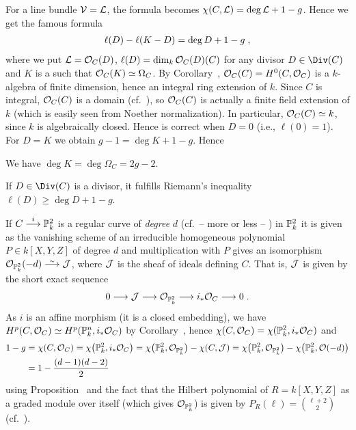 \documentclass[a4paper,parskip=half,numbers=enddot, DIV=12]{scrreprt}
\begin{document}
\begin{rem}
	For a line bundle $\mathcal{V}=\mathcal{L}$, the formula becomes $\chi(C,\mathcal{L})=\deg\mathcal{L}+1-g$. Hence we get the famous formula
	\begin{align}\lbl{eq:RiemannRoch3}
		\ell(D)-\ell(K-D)=\deg D+1-g\;,
	\end{align}
	where we put $\mathcal{L}=\mathcal{O}_C(D)$, $\ell(D)=\dim_k\mathcal{O}_C(D)(C)$ for any divisor $D\in\Div(C)$ and $K$ is a  such that $\mathcal{O}_C(K)\simeq\Omega_C$. By Corollary~, $\mathcal{O}_C(C)=H^0(C,\mathcal{O}_C)$ is a $k$-algebra of finite dimension, hence an integral ring extension of $k$. Since $C$ is integral, $\mathcal{O}_C(C)$ is a domain (cf.\ \cite[Proposition~2.1.4]{alggeo1}), so $\mathcal{O}_C(C)$ is actually a finite field extension of $k$ (which is easily seen from Noether normalization). In particular, $\mathcal{O}_C(C)\simeq k$, since $k$ is algebraically closed. Hence  is correct when $D=0$ (i.e., $\ell(0)=1$). For $D=K$ we obtain $g-1=\deg K+1-g$. Hence
\end{rem}
\begin{fact}
	We have $\deg K=\deg\Omega_C=2g-2$.
\end{fact}
\begin{cor}
	If $D\in\Div(C)$ is a divisor, it fulfills Riemann's inequality $\ell(D)\geq \deg D+1-g$.
\end{cor}
\begin{example}
	If $C\morphism[i]\IP^2_k$ is a regular curve of \emph{degree} $d$ (cf.\ -- more or less -- \cite[Definition~3.1.5]{alg2}) in $\mathbb{P}_k^2$ it is given as the vanishing scheme of an irreducible homogeneous polynomial $P\in k[X,Y,Z]$ of degree $d$ and multiplication with $P$ gives an isomorphism $\Oo_{\IP_k^2}(-d)\isomorphism\Jj$, where $\mathcal{J}$ is the sheaf of ideals defining $C$. That is, $\mathcal{J}$ is given by the short exact sequence
	\begin{align*}
		0\morphism \Jj\morphism\Oo_{\IP_k^2}\morphism i_*\Oo_C\morphism 0\;.
	\end{align*}
	As $i$ is an affine morphism (it is a closed embedding), we have $H^p(C,\mathcal{O}_C)\simeq H^p(\mathbb{P}_k^n,i_*\mathcal{O}_C)$ by Corollary~, hence $\chi(C,\mathcal{O}_C)=\chi(\mathbb{P}_k^2,i_*\mathcal{O}_C)$ and 
	\begin{align*}
		1-g&=\chi(C,\mathcal{O}_C)=\chi\big(\mathbb{P}_k^2,i_*\mathcal{O}_C\big)=\chi\big(\mathbb{P}_k^2,\mathcal{O}_{\mathbb{P}_k^2}\big)-\chi(C,\mathcal{J})=\chi\big(\mathbb{P}_k^2,\mathcal{O}_{\mathbb{P}_k^2}\big)-\chi\big(\mathbb{P}_k^2,\mathcal{O}(-d)\big)\\
		&=1-\frac{(d-1)(d-2)}{2}
	\end{align*}
	using Proposition~ and the fact that the Hilbert polynomial of $R=k[X,Y,Z]$ as a graded module over itself (which gives $\mathcal{O}_{\mathbb{P}_k^2}$) is given by $P_R(\ell)=\binom{\ell+2}{2}$ (cf.\ \cite[Lemma~3.0.1]{alg2}).
\end{example}
\end{document}
